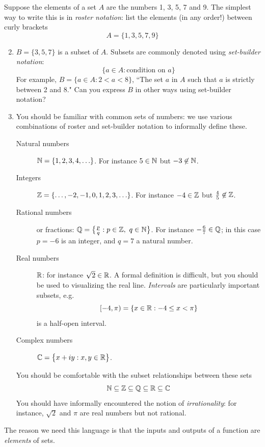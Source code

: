 \begin{examples}{}{}
\exstart Suppose the elements of a set $A$ are the numbers 1, 3, 5, 7 and 9. The simplest way to write this is in \emph{roster notation}: list the elements (in any order!) between curly brackets
\[A=\{1,3,5,7,9\}\]
\begin{enumerate}\setcounter{enumi}{1}
  \item[]$B=\{3,5,7\}$ is a subset of $A$. Subsets are commonly denoted using \emph{set-builder notation}:
	\[\{a\in A:\text{condition on $a$}\}\]
	For example, $B=\{a\in A:2<a<8\}$, ``The set $a$ in $A$ such that $a$ is strictly between 2 and 8." Can you express $B$ in other ways using set-builder notation? 
  \goodbreak
  
  \item You should be familiar with common sets of numbers: we use various combinations of roster and set-builder notation to informally define these.
  \begin{description}
		\item[Natural numbers] $\mathbb{N}=\{1,2,3,4,\ldots\}$. For instance $5\in\mathbb{N}$ but $-3\not\in\mathbb{N}$.
		\item[Integers] $\mathbb{Z}=\{\ldots,-2,-1,0,1,2,3,\ldots\}$. For instance $-4\in\mathbb{Z}$ but $\frac 45\not\in\mathbb{Z}$.
		\item[Rational numbers] or fractions: $\Q=\bigl\{\frac pq:p\in\Z,\ q\in\N\bigr\}$. For instance $-\frac 67\in\mathbb{Q}$; in this case $p=-6$ is an integer, and $q=7$ a natural number.
		\item[Real numbers] $\mathbb{R}$: for instance $\sqrt 2\in\mathbb{R}$. A formal definition is difficult, but you should be used to visualizing the real line. \emph{Intervals} are particularly important subsets, e.g.
		\[[-4,\pi)=\{x\in\mathbb{R}:-4\le x<\pi\}\]
		is a half-open interval.
		\item[Complex numbers] $\mathbb{C}=\bigl\{x+iy:x,y\in\mathbb{R}\bigr\}$.
	\end{description}
	You should be comfortable with the subset relationships between these sets
	\[\mathbb{N}\subseteq\mathbb{Z}\subseteq\mathbb{Q}\subseteq\mathbb{R}\subseteq\mathbb{C}\]
	You should have informally encountered the notion of \emph{irrationality}: for instance, $\sqrt 2$ and $\pi$ are real numbers but not rational.
\end{enumerate}
\end{examples}

\smallskip

The reason we need this language is that the inputs and outputs of a function are \emph{elements} of sets.

